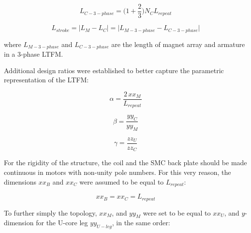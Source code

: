         
        \begin{equation}
            L_{C-3-phase} = \bigg(1+\frac{2}{3}\bigg) N_C L_{repeat} 
            \label{eq:chap/rsm/LTFM/L_C_3phase}
        \end{equation}
        
        
        \begin{equation}
            L_{stroke} = \big| L_M-L_C \big| = \big| L_{M-3-phase} - L_{C-3-phase} \big|
            \label{eq:chap/rsm/LTFM/L_stroke}
        \end{equation}
        
        
        where $L_{M-3-phase}$ and $L_{C-3-phase}$ are the length of magnet array and armature in a 3-phase \acs{LTFM}.

        
        
        Additional design ratios were established to better capture the parametric representation of the \acs{LTFM}:
        
        
        \begin{equation}
            \alpha=\frac{2\,xx_M}{L_{repeat}}
            \label{eq:chap/rsm/LTFM/alpha}
        \end{equation}
        
        
        \begin{equation}
            \beta=\frac{yy_C}{yy_M}
            \label{eq:chap/rsm/LTFM/beta}
        \end{equation}
        
        
        \begin{equation}
            \gamma=\frac{zz_U}{zz_C}
            \label{eq:chap/rsm/LTFM/gamma}
        \end{equation}
        
        
        For the rigidity of the structure, the coil and the SMC back plate should be made continuous in motors with non-unity pole numbers. For this very reason, the dimensions $xx_B$ and $xx_C$ were assumed to be equal to $L_{repeat}$:
        
        
        \begin{equation}
            xx_B = xx_C = L_{repeat}
            \label{eq:chap/rsm/LTFM/xb is xc is lrepeat}
        \end{equation}
        
        
        To further simply the topology, $xx_M$, and $yy_M$ were set to be equal to $xx_U$, and $y$-dimension for the U-core leg $yy_{U-leg}$, in the same order:
        
